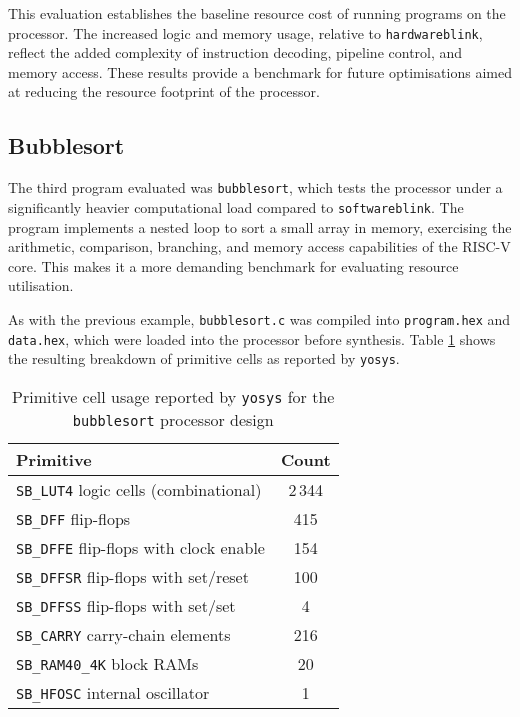 \documentclass[a4paper,10pt]{article}
\begin{document}
This evaluation establishes the baseline resource cost 
of running programs on the processor. 
The increased logic and memory usage, relative to \texttt{hardwareblink}, 
reflect the added complexity of 
instruction decoding, pipeline control, and memory access. 
These results provide a benchmark for future optimisations 
aimed at reducing the resource footprint of the processor.

\subsection{Bubblesort}
\label{sec:Bubblesort}

The third program evaluated was \texttt{bubblesort}, 
which tests the processor under a significantly 
heavier computational load compared to \texttt{softwareblink}. 
The program implements a nested loop to sort a small array in memory, 
exercising the arithmetic, comparison, branching, 
and memory access capabilities of the RISC-V core. 
This makes it a more demanding benchmark for 
evaluating resource utilisation.

As with the previous example, 
\texttt{bubblesort.c} was compiled into 
\texttt{program.hex} and \texttt{data.hex}, 
which were loaded into the processor before synthesis. 
Table \ref{tab:bubblesort_yosys_report} shows the resulting breakdown of 
primitive cells as reported by \texttt{yosys}.

\begin{table}[H]
    \centering
    \begin{tabular}{|l|c|}
        \hline
        \textbf{Primitive} & \textbf{Count} \\
        \hline
        \texttt{SB\_LUT4} logic cells (combinational) & 2\,344 \\
        \texttt{SB\_DFF} flip-flops & 415 \\
        \texttt{SB\_DFFE} flip-flops with clock enable & 154 \\
        \texttt{SB\_DFFSR} flip-flops with set/reset & 100 \\
        \texttt{SB\_DFFSS} flip-flops with set/set & 4 \\
        \texttt{SB\_CARRY} carry-chain elements & 216 \\
        \texttt{SB\_RAM40\_4K} block RAMs & 20 \\
        \texttt{SB\_HFOSC} internal oscillator & 1 \\
        \hline
    \end{tabular}
    \caption{Primitive cell usage reported by 
    \texttt{yosys} for the \texttt{bubblesort} processor design}
    \label{tab:bubblesort_yosys_report}
\end{table}
\end{document}
